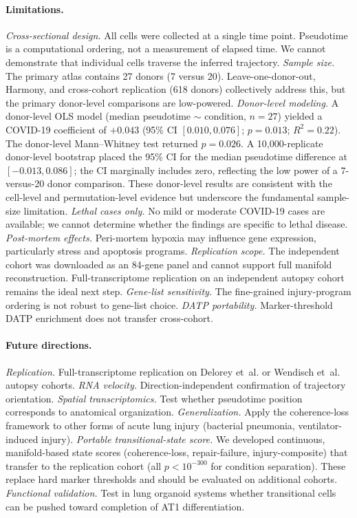 \documentclass[11pt]{article}
\begin{document}
\paragraph{Limitations.}
\emph{Cross-sectional design.} All cells were collected at a single time point. Pseudotime is a computational ordering, not a measurement of elapsed time. We cannot demonstrate that individual cells traverse the inferred trajectory.
\emph{Sample size.} The primary atlas contains 27 donors (7 versus 20). Leave-one-donor-out, Harmony, and cross-cohort replication (618 donors) collectively address this, but the primary donor-level comparisons are low-powered.
\emph{Donor-level modeling.} A donor-level OLS model (median pseudotime $\sim$ condition, $n = 27$) yielded a COVID-19 coefficient of $+0.043$ (95\% CI $[0.010, 0.076]$; $p = 0.013$; $R^2 = 0.22$). The donor-level Mann--Whitney test returned $p = 0.026$. A 10{,}000-replicate donor-level bootstrap placed the 95\% CI for the median pseudotime difference at $[-0.013, 0.086]$; the CI marginally includes zero, reflecting the low power of a 7-versus-20 donor comparison. These donor-level results are consistent with the cell-level and permutation-level evidence but underscore the fundamental sample-size limitation.
\emph{Lethal cases only.} No mild or moderate COVID-19 cases are available; we cannot determine whether the findings are specific to lethal disease.
\emph{Post-mortem effects.} Peri-mortem hypoxia may influence gene expression, particularly stress and apoptosis programs.
\emph{Replication scope.} The independent cohort was downloaded as an 84-gene panel and cannot support full manifold reconstruction. Full-transcriptome replication on an independent autopsy cohort remains the ideal next step.
\emph{Gene-list sensitivity.} The fine-grained injury-program ordering is not robust to gene-list choice.
\emph{DATP portability.} Marker-threshold DATP enrichment does not transfer cross-cohort.

\paragraph{Future directions.}
\emph{Replication.} Full-transcriptome replication on Delorey et~al. \citep{Delorey2021} or Wendisch et~al. \citep{Wendisch2021} autopsy cohorts.
\emph{RNA velocity.} Direction-independent confirmation of trajectory orientation.
\emph{Spatial transcriptomics.} Test whether pseudotime position corresponds to anatomical organization.
\emph{Generalization.} Apply the coherence-loss framework to other forms of acute lung injury (bacterial pneumonia, ventilator-induced injury).
\emph{Portable transitional-state score.} We developed continuous, manifold-based state scores (coherence-loss, repair-failure, injury-composite) that transfer to the replication cohort (all $p < 10^{-300}$ for condition separation). These replace hard marker thresholds and should be evaluated on additional cohorts.
\emph{Functional validation.} Test in lung organoid systems whether transitional cells can be pushed toward completion of AT1 differentiation.
\end{document}
